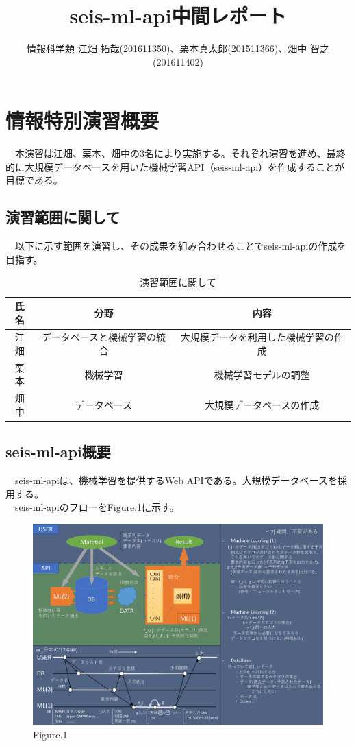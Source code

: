 \documentclass{scrartcl}
\author{情報科学類 江畑 拓哉(201611350)、栗本真太郎(201511366)、畑中 智之(201611402)}
\date{}
\title{seis-ml-api中間レポート}
\begin{document}
\maketitle
\tableofcontents

\section{情報特別演習概要}
\label{sec:org9f80ab5}
　本演習は江畑、栗本、畑中の3名により実施する。それぞれ演習を進め、最終的に大規模データベースを用いた機械学習API（seis-ml-api）を作成することが目標である。\\

\subsection{演習範囲に関して}
\label{sec:org40df129}
　以下に示す範囲を演習し、その成果を組み合わせることでseis-ml-apiの作成を目指す。\\

\begin{table}[htbp]
\caption{演習範囲に関して}
\centering
\begin{tabular}{|c|c|c|}
\hline
氏名 & 分野 & 内容\\
\hline
江畑 & データベースと機械学習の統合 & 大規模データを利用した機械学習の作成\\
\hline
栗本 & 機械学習 & 機械学習モデルの調整\\
\hline
畑中 & データベース & 大規模データベースの作成\\

\hline
\end{tabular}
\end{table}

\subsection{seis-ml-api概要}
\label{sec:orgd312151}
　seis-ml-apiは、機械学習を提供するWeb APIである。大規模データベースを採用する。\\
　seis-ml-apiのフローをFigure.1に示す。\\

\begin{figure}[htbp]
\centering
\includegraphics[width=15cm]{./idea-0-1.png}
\caption{Figure.1}
\end{figure}
\end{document}
